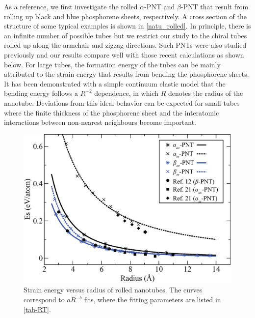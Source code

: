 As a reference, we first investigate the rolled $\alpha$-PNT and $\beta$-PNT that result from rolling up black and blue phosphorene sheets, respectively. A cross section of the structure of some typical examples is shown in \autoref{natu_rolled}. In principle, there is an infinite number of possible tubes but we restrict our study to the chiral tubes rolled up along the armchair and zigzag directions. Such PNTs were also studied previously\cite{Guan2014a,Guo2014} and our results compare well with those recent calculations as shown below. For large tubes, the formation energy of the tubes can be mainly attributed to the strain energy that results from bending the phosphorene sheets. It has been demonstrated with a simple continuum elastic model that the bending energy follows a $R^{-2}$ dependence, in which $R$ denotes the radius of the nanotube\cite{tib84,rob92}. Deviations from this ideal behavior can be expected for small tubes where the finite thickness of the phosphorene sheet and the interatomic interactions between non-nearest neighbours become important.

\begin{figure}[htb]
\centering
\includegraphics[width=0.8\linewidth]{Nanotu_energy_tubes.eps}%
\caption{Strain energy versus radius of rolled nanotubes. The curves correspond to $aR^{-b}$ fits, where the fitting parameters are listed in \autoref{tab-RT}. \label{rolled_energy}}
\end{figure}

